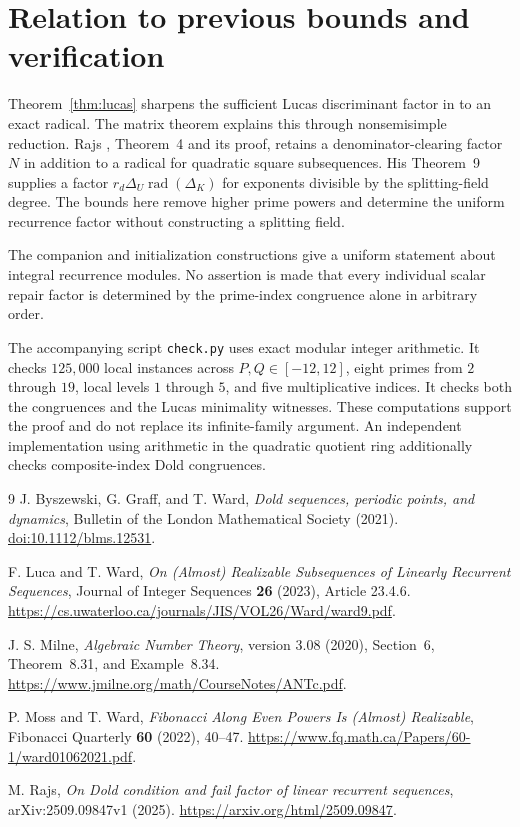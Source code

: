 \documentclass[11pt]{article}
\theoremstyle{remark}
\newcommand{\rad}{\operatorname{rad}}
\begin{document}
\section{Relation to previous bounds and verification}

Theorem~\ref{thm:lucas} sharpens the sufficient Lucas discriminant factor in \cite{MW,LW} to an exact radical. The matrix theorem explains this through nonsemisimple reduction. Rajs \cite{Rajs}, Theorem~4 and its proof, retains a denominator-clearing factor $N$ in addition to a radical for quadratic square subsequences. His Theorem~9 supplies a factor $r_d\Delta_U\rad(\Delta_K)$ for exponents divisible by the splitting-field degree. The bounds here remove higher prime powers and determine the uniform recurrence factor without constructing a splitting field.

The companion and initialization constructions give a uniform statement about integral recurrence modules. No assertion is made that every individual scalar repair factor is determined by the prime-index congruence alone in arbitrary order.

The accompanying script \texttt{check.py} uses exact modular integer arithmetic. It checks $125{,}000$ local instances across $P,Q\in[-12,12]$, eight primes from $2$ through $19$, local levels $1$ through $5$, and five multiplicative indices. It checks both the congruences and the Lucas minimality witnesses. These computations support the proof and do not replace its infinite-family argument. An independent implementation using arithmetic in the quadratic quotient ring additionally checks composite-index Dold congruences.

\begin{thebibliography}{9}
J. Byszewski, G. Graff, and T. Ward,
\emph{Dold sequences, periodic points, and dynamics},
Bulletin of the London Mathematical Society (2021).
\href{https://doi.org/10.1112/blms.12531}{doi:10.1112/blms.12531}.

F. Luca and T. Ward,
\emph{On (Almost) Realizable Subsequences of Linearly Recurrent Sequences},
Journal of Integer Sequences \textbf{26} (2023), Article 23.4.6.
\url{https://cs.uwaterloo.ca/journals/JIS/VOL26/Ward/ward9.pdf}.

J. S. Milne,
\emph{Algebraic Number Theory}, version 3.08 (2020),
Section~6, Theorem~8.31, and Example~8.34.
\url{https://www.jmilne.org/math/CourseNotes/ANTc.pdf}.

P. Moss and T. Ward,
\emph{Fibonacci Along Even Powers Is (Almost) Realizable},
Fibonacci Quarterly \textbf{60} (2022), 40--47.
\url{https://www.fq.math.ca/Papers/60-1/ward01062021.pdf}.

M. Rajs,
\emph{On Dold condition and fail factor of linear recurrent sequences},
arXiv:2509.09847v1 (2025).
\url{https://arxiv.org/html/2509.09847}.
\end{thebibliography}
\end{document}
